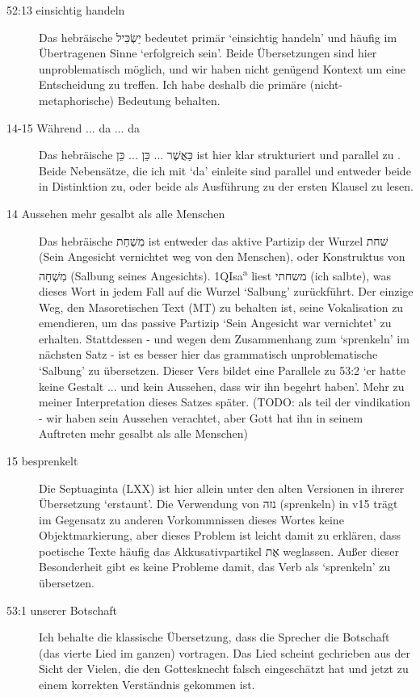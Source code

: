 \begin{description}
	\item[52:13 einsichtig handeln] Das hebräische יַשְׂכִּיל bedeutet primär `einsichtig handeln' und häufig im Übertragenen Sinne `erfolgreich sein'.
		Beide Übersetzungen sind hier unproblematisch möglich, und wir haben nicht genügend Kontext um eine Entscheidung zu treffen.
		Ich habe deshalb die primäre (nicht-metaphorische) Bedeutung behalten.
	\item[14-15 Während ... da ... da] Das hebräische כַּאֲשֶׁר ... כֵּן ... כֵּן ist hier klar strukturiert und parallel zu .
		Beide Nebensätze, die ich mit `da' einleite sind parallel und entweder beide in Distinktion zu, oder beide als Ausführung zu der ersten Klausel zu lesen.
	\item[14 Aussehen mehr gesalbt als alle Menschen] Das hebräische מִשְׁחַת ist entweder das aktive Partizip der Wurzel שׁחת (Sein Angesicht vernichtet weg von den Menschen), oder Konstruktus von מִשְׁחָה (Salbung seines Angesichts).
		1QIsa\textsuperscript{a} liest משחתי (ich salbte), was dieses Wort in jedem Fall auf die Wurzel `Salbung' zurückführt.
		Der einzige Weg, den Masoretischen Text (MT) zu behalten ist, seine Vokalisation zu emendieren, um das passive Partizip `Sein Angesicht war vernichtet' zu erhalten.
		Stattdessen - und wegen dem Zusammenhang zum `sprenkeln' im nächsten Satz - ist es besser hier das grammatisch unproblematische `Salbung' zu übersetzen.
		Dieser Vers bildet eine Parallele zu 53:2 `er hatte keine Gestalt ... und kein Aussehen, dass wir ihn begehrt haben'.
		Mehr zu meiner Interpretation dieses Satzes später. (TODO: als teil der vindikation - wir haben sein Aussehen verachtet, aber Gott hat ihn in seinem Auftreten mehr gesalbt als alle Menschen)
	\item[15 besprenkelt] Die Septuaginta (LXX) ist hier allein unter den alten Versionen in ihrerer Übersetzung `erstaunt'.
		Die Verwendung von נזה (sprenkeln) in v15 trägt im Gegensatz zu anderen Vorkommnissen dieses Wortes keine Objektmarkierung, aber dieses Problem ist leicht damit zu erklären, dass poetische Texte häufig das Akkusativpartikel אֶת weglassen.
		Außer dieser Besonderheit gibt es keine Probleme damit, das Verb als `sprenkeln' zu übersetzen.
	\item[53:1 unserer Botschaft] Ich behalte die klassische Übersetzung, dass die Sprecher die Botschaft (das vierte Lied im ganzen) vortragen.
		Das Lied scheint gechrieben aus der Sicht der Vielen, die den Gottesknecht falsch eingeschätzt hat und jetzt zu einem korrekten Verständnis gekommen ist.

\end{description}
